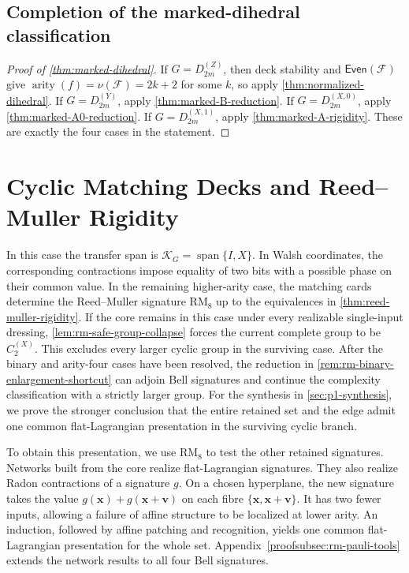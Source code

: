 \documentclass[11pt,letterpaper,onecolumn]{article}
\theoremstyle{plain}
\theoremstyle{definition}
\theoremstyle{remark}
\newcommand{\cF}{\mathcal F}
\newcommand{\DihZ}[1]{{D_{#1}^{(Z)}}}
\newcommand{\DihY}[1]{{D_{#1}^{(Y)}}}
\newcommand{\DihXzero}[1]{{D_{#1}^{(X,0)}}}
\newcommand{\DihXone}[1]{{D_{#1}^{(X,1)}}}
\newcommand{\CycX}[1]{{C_{#1}^{(X)}}}
\newcommand{\Even}{\mathsf{Even}}
\newcommand{\Span}{\operatorname{span}}
\newcommand{\arity}{\operatorname{arity}}
\newcommand{\RMcore}{\mathrm{RM}_8}
\begin{document}
\subsection{Completion of the marked-dihedral classification}

\begin{proof}[Proof of \cref{thm:marked-dihedral}]
If \(G=\DihZ{2m}\), then deck stability and \(\Even(\cF)\) give
\(\arity(f)=\nu(\cF)=2k+2\) for some \(k\), so apply
\cref{thm:normalized-dihedral}.  If \(G=\DihY{2m}\), apply
\cref{thm:marked-B-reduction}.  If \(G=\DihXzero{2m}\), apply
\cref{thm:marked-A0-reduction}.  If \(G=\DihXone{2m}\), apply
\cref{thm:marked-A-rigidity}.  These are exactly the four cases in the
statement.
\end{proof}
\section{Cyclic Matching Decks and Reed--Muller Rigidity}
\label{sec:proper-deck}

In this case the transfer span is \(\mathscr K_G=\Span\{I,X\}\).
In Walsh coordinates, the corresponding contractions impose equality
of two bits with a possible phase on their common value. In the remaining
higher-arity case, the matching cards determine the Reed--Muller signature
\(\RMcore\) up to the equivalences in \cref{thm:reed-muller-rigidity}.
If the core remains in this case under every realizable single-input
dressing, \cref{lem:rm-safe-group-collapse} forces the current complete
group to be \(\CycX{2}\). This excludes every larger cyclic group in the
surviving case. After the binary and arity-four cases have been resolved,
the reduction in \cref{rem:rm-binary-enlargement-shortcut} can adjoin
Bell signatures and continue the complexity classification with a strictly
larger group. For the synthesis in \cref{sec:p1-synthesis}, we prove the
stronger conclusion that the entire retained
set and the edge admit one common flat-Lagrangian presentation in the surviving cyclic branch.

To obtain this presentation, we use \(\RMcore\) to test the other retained
signatures. Networks built from the core realize flat-Lagrangian signatures.
They also realize Radon contractions of a signature \(g\). On a chosen
hyperplane, the new signature takes the value \(g(\mathbf x)+g(\mathbf x+\mathbf v)\)
on each fibre \(\{\mathbf x,\mathbf x+\mathbf v\}\). It has two
fewer inputs, allowing a failure of affine structure to be localized at
lower arity. An induction, followed by affine patching and recognition, yields one common
flat-Lagrangian presentation for the whole set.
Appendix~\ref{proofsubsec:rm-pauli-tools} extends the network results
to all four Bell signatures.
\end{document}
